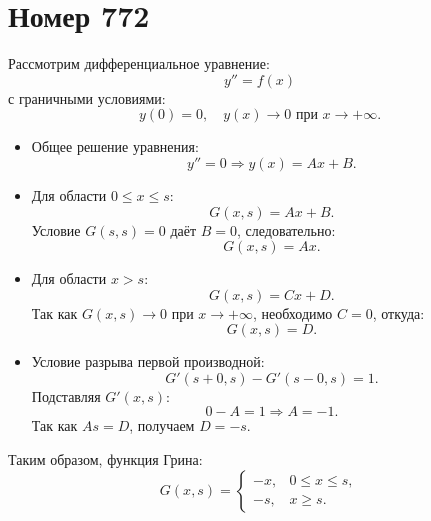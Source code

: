 \section*{Номер 772}
Рассмотрим дифференциальное уравнение:
\begin{equation}
    y'' = f(x)
\end{equation}
с граничными условиями:
\begin{equation}
    y(0) = 0, \quad y(x) \to 0 \text{ при } x \to +\infty.
\end{equation}

\begin{solution}
    \begin{itemize}
        \item Общее решение уравнения:
              \begin{equation}
                  y'' = 0 \Rightarrow y(x) = Ax + B.
              \end{equation}
        \item Для области $0 \leq x \leq s$:
              \begin{equation}
                  G(x,s) = Ax + B.
              \end{equation}
              Условие $G(s,s) = 0$ даёт $B = 0$, следовательно:
              \begin{equation}
                  G(x,s) = A x.
              \end{equation}
        \item Для области $x > s$:
              \begin{equation}
                  G(x,s) = Cx + D.
              \end{equation}
              Так как $G(x,s) \to 0$ при $x \to +\infty$, необходимо $C = 0$, откуда:
              \begin{equation}
                  G(x,s) = D.
              \end{equation}
        \item Условие разрыва первой производной:
              \begin{equation}
                  G'(s+0, s) - G'(s-0, s) = 1.
              \end{equation}
              Подставляя $G'(x,s)$:
              \begin{equation}
                  0 - A = 1 \Rightarrow A = -1.
              \end{equation}
              Так как $A s = D$, получаем $D = -s$.
    \end{itemize}

    Таким образом, функция Грина:
    \begin{equation}
        G(x,s) =
        \begin{cases}
            -x, & 0 \leq x \leq s, \\
            -s, & x \geq s.
        \end{cases}
    \end{equation}
\end{solution}\pagebreak